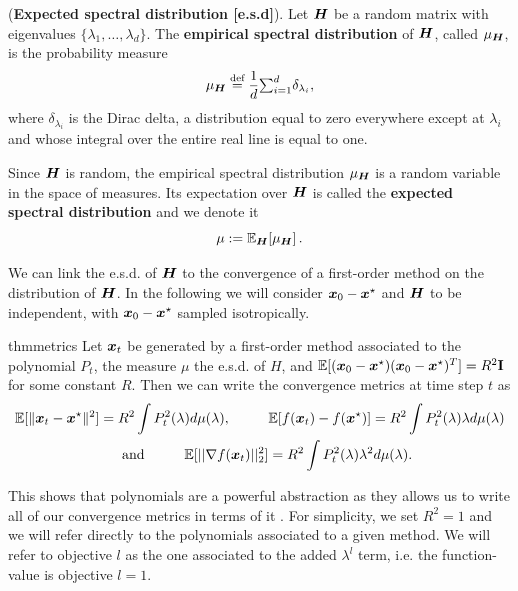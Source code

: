 \documentclass{article}
\begin{document}
\begin{definition}
(\textbf{Expected spectral distribution [e.s.d]}). 
Let ${\boldsymbol H}$ be a random matrix with eigenvalues $\{\lambda_1, \ldots, \lambda_d\}$. The \textbf{empirical spectral distribution} of ${\boldsymbol H}$, called ${\mu}_{{\boldsymbol H}}$, is the probability measure
\begin{equation}\label{eq:wighted_spectral_density}
    \mu_{{\boldsymbol H}} \stackrel{\text{def}}{=} \frac{1}{d}{\textstyle{\sum_{i=1}^d}} \delta_{\lambda_i},
\end{equation}
where $\delta_{\lambda_i}$ is the Dirac delta, a distribution equal to zero everywhere except at $\lambda_i$ and whose integral over the entire real line is equal to one.

Since ${\boldsymbol H}$ is random, the empirical spectral distribution $\mu_{\boldsymbol H}$ is a  random variable in the space of measures. Its expectation over ${\boldsymbol H}$ is called the \textbf{expected spectral distribution} and we denote it
\begin{equation}
\mu := {\mathbb{E}}_{{\boldsymbol H}}[\mu_{{\boldsymbol H}}]\,.
\end{equation}
\end{definition}

We can link the e.s.d. of ${\boldsymbol H}$ to the convergence of a first-order method on the distribution of ${\boldsymbol H}$. In the following we will consider ${\boldsymbol x}_0-{\boldsymbol x}^\star$ and ${\boldsymbol H}$ to be independent, with ${\boldsymbol x}_0-{\boldsymbol x}^\star$ sampled isotropically. %

\begin{restatable}{thm}{metrics} \label{thm: metrics}
Let ${\boldsymbol x}_t$ be generated by a first-order method associated to the polynomial $P_t$, the measure $\mu$ the  e.s.d. of $H$, and $\mathbb{E}[({\boldsymbol x}_0-{\boldsymbol x}^\star)({\boldsymbol x}_0-{\boldsymbol x}^\star)^T]=R^2\textbf{I}$ for some constant $R$. Then we can write the convergence metrics at time step  $t$ as
\begin{equation}
\begin{split}
\label{eq:error_norm_x}
  \mathbb{E}[\|{\boldsymbol x}_t-{\boldsymbol x}^\star\|^2] = { R^2} \int {P_t^2(\lambda) d\mu(\lambda)}, \hspace{1 cm}
    &\mathbb{E}[f({\boldsymbol x}_t)-f({\boldsymbol x}^\star)]=R^2\int P_t^2(\lambda)\lambda d\mu(\lambda)\\
    \text{and} \hspace{1 cm} \mathbb{E}[||\nabla f({\boldsymbol x}_t)||^2_2]&=R^2\int P_t^2(\lambda)\lambda^2d\mu(\lambda) .
\end{split}
\end{equation}
\end{restatable}
This shows that polynomials are a powerful abstraction as they allows us to write all of our convergence metrics in terms of it . For simplicity, we set $R^2 = 1$ and we will refer directly to the polynomials associated to a given method. We will refer to objective $l$ as the one associated to the added $\lambda^l$ term, i.e. the function-value is objective $l=1$.
\end{document}
